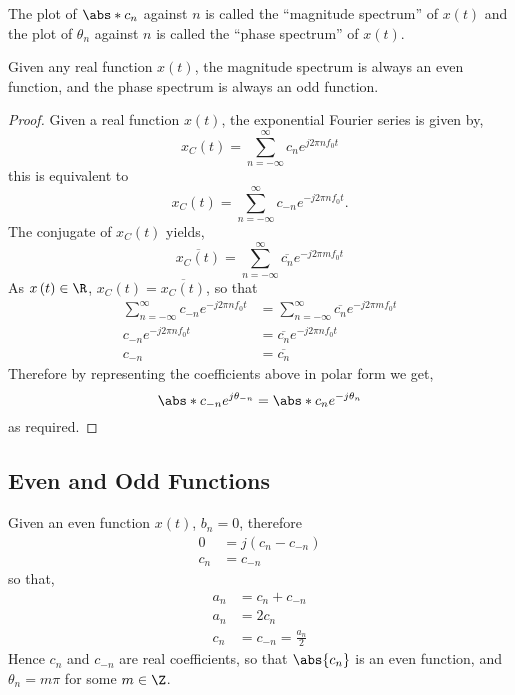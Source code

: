 \documentclass{article}
\begin{document}
The plot of \(\abs*{c_n}\) against \(n\) is called the ``magnitude spectrum'' of \(x\left( t \right)\) and
the plot of \(\theta_n\) against \(n\) is called the ``phase spectrum'' of \(x\left( t \right)\).
\begin{theorem}
    Given any real function \(x\left( t \right)\), the magnitude spectrum is always an even function,
    and the phase spectrum is always an odd function.
\end{theorem}
\begin{proof}
    Given a real function \(x\left( t \right)\), the exponential Fourier series is given by,
    \begin{equation*}
        x_C\left( t \right) = \sum_{n = -\infty}^\infty c_n e^{j 2\pi n f_0 t}
    \end{equation*}
    this is equivalent to
    \begin{equation*}
        x_C\left( t \right) = \sum_{n = -\infty}^\infty c_{-n} e^{-j 2\pi n f_0 t}.
    \end{equation*}
    The conjugate of \(x_C\left( t \right)\) yields,
    \begin{equation*}
        \overline{x_C\left( t \right)} = \sum_{n = -\infty}^\infty \overline{c_{n}} e^{-j 2\pi m f_0 t}
    \end{equation*}
    As \(x\left( t \right) \in \R\), \(x_C\left( t \right) = \overline{x_C\left( t \right)}\), so that
    \begin{align*}
        \sum_{n = -\infty}^\infty c_{-n} e^{-j 2\pi n f_0 t} & = \sum_{n = -\infty}^\infty \overline{c_{n}} e^{-j 2\pi m f_0 t} \\
        c_{-n} e^{-j 2\pi n f_0 t}                           & = \overline{c_n} e^{-j 2\pi n f_0 t}                             \\
        c_{-n}                                               & = \overline{c_n}
    \end{align*}
    Therefore by representing the coefficients above in polar form we get,
    \begin{equation*}
        \abs*{c_{-n}} e^{j \theta_{-n}} = \abs*{c_n} e^{-j \theta_n}
    \end{equation*}
    as required.
\end{proof}
\subsection{Even and Odd Functions}
Given an even function \(x\left( t \right)\), \(b_n = 0\), therefore
\begin{align*}
    0   & = j \left( c_n - c_{-n} \right) \\
    c_n & = c_{-n}
\end{align*}
so that,
\begin{align*}
    a_n & = c_n + c_{-n}           \\
    a_n & = 2 c_n                  \\
    c_n & = c_{-n} = \frac{a_n}{2}
\end{align*}
Hence \(c_n\) and \(c_{-n}\) are real coefficients, so that \(\abs{c_n}\) is an even function, and \(\theta_n = m \pi\) for some \(m \in \Z\).
\end{document}
